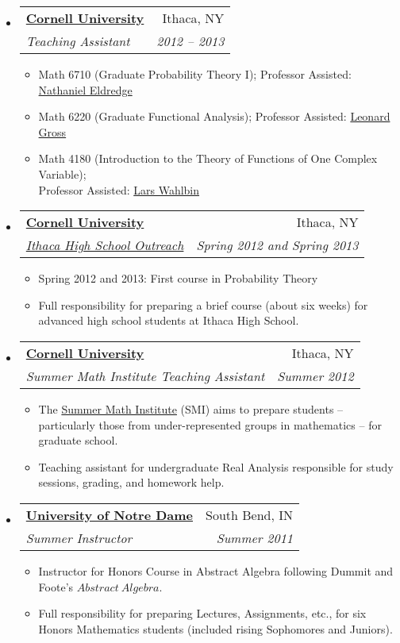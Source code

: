 \documentclass[letterpaper,11pt]{article}
\makeatletter
\newcommand{\resitem}[1]{\item #1 \vspace{-2pt}}
\newenvironment{widetable}[1]
	       {\begin{tabular*}{#1}[t]{l@{\extracolsep{\fill}}r}}
	       {\end{tabular*}}
\newcommand{\ressubheading}[4]{
  \begin{widetable}{\textwidth - 28pt}
		\textbf{#1} & #2 \\
		\textit{#3} & \textit{#4} \\
  \end{widetable}
  \vspace{-12pt}}
\makeatother
\begin{document}
\begin{itemize}
\item
  \ressubheading{\href{http://www.math.cornell.edu}{Cornell University}}
		{Ithaca, NY}
		{Teaching Assistant}
		{2012 -- 2013}
              	\begin{itemize}
		 \resitem{Math 6710 (Graduate
                    Probability Theory I); Professor Assisted: \href{http://www.math.cornell.edu/~neldredge/}{Nathaniel Eldredge}}
                    \resitem{Math 6220 (Graduate Functional Analysis); Professor Assisted: \href{http://www.math.cornell.edu/People/Faculty/grossl.html}{Leonard Gross}}
                     \resitem{Math 4180 (Introduction to the Theory of Functions of One Complex Variable); \\Professor Assisted: \href{http://www.math.cornell.edu/People/Faculty/wahlbin.html}{Lars Wahlbin}}
		\end{itemize}
				  \item
  \ressubheading{\href{http://www.math.cornell.edu}{Cornell University}}
		{Ithaca, NY}
		{\href{http://www.math.cornell.edu/Community/enrichment.html}{Ithaca High School Outreach}}
		{Spring 2012 and Spring 2013}
		  \begin{itemize}
		    \resitem{Spring 2012 and 2013: First course in Probability Theory}
		    \resitem{Full responsibility for preparing a brief course (about six weeks) for advanced high school students at Ithaca High School. }
		  \end{itemize}
				    \item
  \ressubheading{\href{http://www.math.cornell.edu}{Cornell University}}
		{Ithaca, NY}
		{Summer Math Institute Teaching Assistant}
		{Summer 2012}
		  \begin{itemize}
		    \resitem{The \href{http://www.math.cornell.edu/~smi/}{Summer Math Institute} (SMI) aims to prepare students -- particularly those from under-represented groups in mathematics -- for graduate school.}
		    \resitem{Teaching assistant for undergraduate Real Analysis responsible for study sessions, grading, and homework help.}
		  \end{itemize}
		\item
  \ressubheading{\href{http://www.math.nd.edu}{University of Notre Dame}}
		{South Bend, IN}
		{Summer Instructor}
		{Summer 2011}
              	\begin{itemize}
		  \resitem{Instructor for
                    Honors Course in Abstract Algebra following Dummit and Foote's $\mathit{Abstract  \ Algebra}$.}
                    \resitem{Full responsibility for preparing Lectures, Assignments, etc., for six Honors Mathematics students (included rising Sophomores and Juniors).}

\end{itemize}
\end{itemize}
\end{document}
